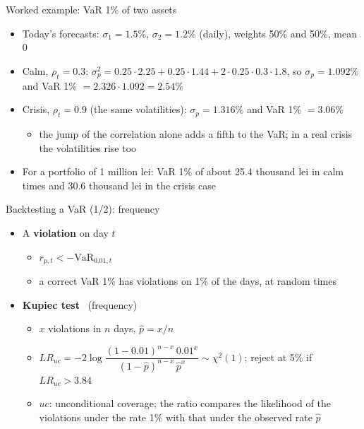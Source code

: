 \begin{frame}{Worked example: VaR 1\% of two assets}
\itemsize{\small}
\begin{itemize}
    \item Today's forecasts: $\sigma_1 = 1.5\%$, $\sigma_2 = 1.2\%$ (daily), weights 50\% and 50\%, mean 0
    \item Calm, $\rho_t = 0.3$: $\sigma_p^2 = 0.25 \cdot 2.25 + 0.25 \cdot 1.44 + 2 \cdot 0.25 \cdot 0.3 \cdot 1.8$, so $\sigma_p = 1.092\%$ and VaR 1\% $= 2.326 \cdot 1.092 = 2.54\%$
    \item Crisis, $\rho_t = 0.9$ (the same volatilities): $\sigma_p = 1.316\%$ and VaR 1\% $= 3.06\%$
    \begin{itemize}
        \item the jump of the correlation alone adds a fifth to the VaR; in a real crisis the volatilities rise too
    \end{itemize}
    \item For a portfolio of 1 million lei: VaR 1\% of about 25.4 thousand lei in calm times and 30.6 thousand lei in the crisis case
\end{itemize}
\end{frame}

\begin{frame}{Backtesting a VaR (1/2): frequency}
\itemsize{\footnotesize}
\begin{itemize}
    \item A \textbf{violation} on day $t$
    \begin{itemize}
        \item $r_{p,t} < -\mathrm{VaR}_{0.01,t}$
        \item a correct VaR 1\% has violations on 1\% of the days, at random times
    \end{itemize}
    \item \textbf{Kupiec test} \ (frequency)
    \begin{itemize}
        \item $x$ violations in $n$ days, $\hat p = x/n$
        \item $LR_{uc} = -2\log\dfrac{(1-0.01)^{n-x}\,0.01^{x}}{(1-\hat p)^{n-x}\,\hat p^{x}} \sim \chi^2(1)$; reject at 5\% if $LR_{uc} > 3.84$
        \item $uc$: unconditional coverage; the ratio compares the likelihood of the violations under the rate 1\% with that under the observed rate $\hat p$
    \end{itemize}
\end{itemize}
\end{frame}

